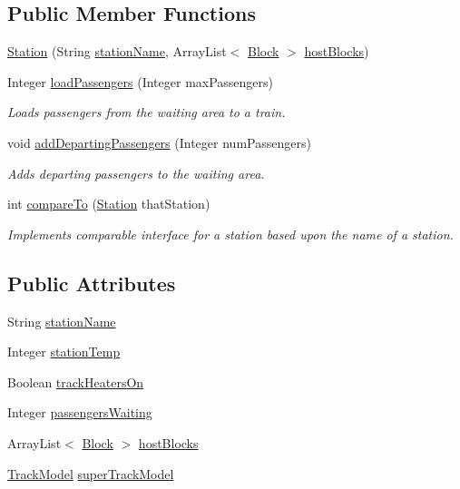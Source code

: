 \subsection*{Public Member Functions}
\begin{DoxyCompactItemize}
\item 
\hyperlink{classTrackModel_1_1Station_a7eed6cecf5fb632c26a6064494b87ef9}{Station} (String \hyperlink{classTrackModel_1_1Station_ade0b039b51a3d1ff2c2a50dcb8aae373}{station\+Name}, Array\+List$<$ \hyperlink{classTrackModel_1_1Block}{Block} $>$ \hyperlink{classTrackModel_1_1Station_a883b119a2527361b3d1e0bc9d7a8910e}{host\+Blocks})
\item 
Integer \hyperlink{classTrackModel_1_1Station_abba652aa7df49e552eebdc1fa4b1fae7}{load\+Passengers} (Integer max\+Passengers)
\begin{DoxyCompactList}\small\item\em Loads passengers from the waiting area to a train. \end{DoxyCompactList}\item 
void \hyperlink{classTrackModel_1_1Station_a25a87034f554af5c03c420d89e63d3e3}{add\+Departing\+Passengers} (Integer num\+Passengers)
\begin{DoxyCompactList}\small\item\em Adds departing passengers to the waiting area. \end{DoxyCompactList}\item 
int \hyperlink{classTrackModel_1_1Station_adca3eabc08f04c22e9f0f26c93ca9523}{compare\+To} (\hyperlink{classTrackModel_1_1Station}{Station} that\+Station)
\begin{DoxyCompactList}\small\item\em Implements comparable interface for a station based upon the name of a station. \end{DoxyCompactList}\end{DoxyCompactItemize}
\subsection*{Public Attributes}
\begin{DoxyCompactItemize}
\item 
String \hyperlink{classTrackModel_1_1Station_ade0b039b51a3d1ff2c2a50dcb8aae373}{station\+Name}
\item 
Integer \hyperlink{classTrackModel_1_1Station_ac5bcaf08656757e65ce426d4fcf5f8d6}{station\+Temp}
\item 
Boolean \hyperlink{classTrackModel_1_1Station_ae02bb86e9422f05d89f8c3cc52cc21bf}{track\+Heaters\+On}
\item 
Integer \hyperlink{classTrackModel_1_1Station_ae1fd79a5284565937a5b3b04d8e7c12e}{passengers\+Waiting}
\item 
Array\+List$<$ \hyperlink{classTrackModel_1_1Block}{Block} $>$ \hyperlink{classTrackModel_1_1Station_a883b119a2527361b3d1e0bc9d7a8910e}{host\+Blocks}
\item 
\hyperlink{classTrackModel_1_1TrackModel}{Track\+Model} \hyperlink{classTrackModel_1_1Station_aad52bf83bfb9f6c2753e6b0e39c17fc8}{super\+Track\+Model}
\end{DoxyCompactItemize}

